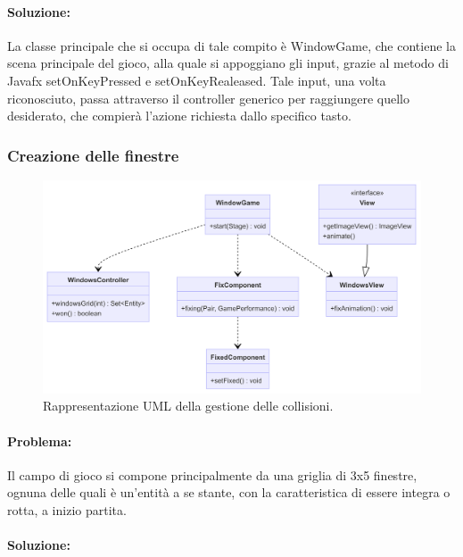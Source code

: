 \documentclass[a4paper,12pt]{report}
\begin{document}
\paragraph{Soluzione:}
La classe principale che si occupa di tale compito è WindowGame, che contiene la scena principale del gioco, alla quale si appoggiano gli input, grazie al metodo di Javafx setOnKeyPressed e setOnKeyRealeased.
Tale input, una volta riconosciuto, passa attraverso il controller generico per raggiungere quello desiderato, che compierà l'azione richiesta dallo specifico tasto.

\subsubsection{Creazione delle finestre}

\begin{figure}[H]
\centering{}
\includegraphics[width=\textwidth]{img/windows.png}
\caption{Rappresentazione UML della gestione delle collisioni.}
\end{figure}

\paragraph{Problema:}
Il campo di gioco si compone principalmente da una griglia di 3x5 finestre, ognuna delle quali è un'entità a se stante, con la caratteristica di essere integra o rotta, a inizio partita.

\paragraph{Soluzione:}
\end{document}
